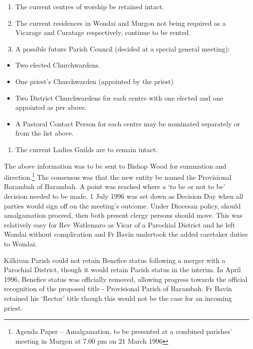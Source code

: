 \begin{enumerate}
\def\labelenumi{\arabic{enumi}.}
\setcounter{enumi}{2}
\item
  The current centres of worship be retained intact.
\item
  The current residences in Wondai and Murgon not being required as a Vicarage and Curatage respectively, continue to be rented.
\item
  A possible future Parish Council (decided at a special general meeting):
\end{enumerate}

\begin{itemize}
\item
  Two elected Churchwardens.
\item
  One priest's Churchwarden (appointed by the priest)
\item
  Two District Churchwardens for each centre with one elected and one appointed as per above.
\item
  A Pastoral Contact Person for each centre may be nominated separately or from the list above.
\end{itemize}

\begin{enumerate}
\def\labelenumi{\arabic{enumi}.}
\setcounter{enumi}{5}
\item
  The current Ladies Guilds are to remain intact.
\end{enumerate}

The above information was to be sent to Bishop Wood for summation and direction.\footnote{Agenda Paper -- Amalgamation, to be presented at a combined parishes' meeting in Murgon at 7.00 pm on 21 March 1996} The consensus was that the new entity be named the Provisional Barambah of Barambah. A point was reached where a `to be or not to be' decision needed to be made. 1 July 1996 was set down as Decision Day when all parties would sign off on the meeting's outcome. Under Diocesan policy, should amalgamation proceed, then both present clergy persons should move. This was relatively easy for Rev Watlemaro as Vicar of a Parochial District and he left Wondai without complication and Fr Bavin undertook the added caretaker duties to Wondai.

Kilkivan Parish could not retain Benefice status following a merger with a Parochial District, though it would retain Parish status in the interim. In April 1996, Benefice status was officially removed, allowing progress towards the official recognition of the proposed title - Provisional Parish of Barambah. Fr Bavin retained his `Rector' title though this would not be the case for an incoming priest.

